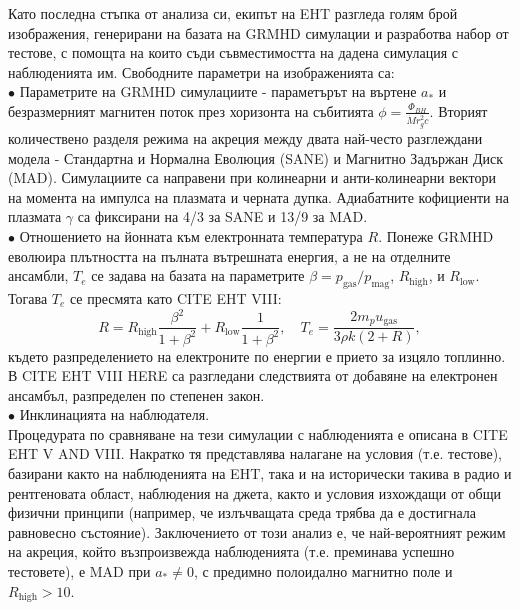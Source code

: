 Като последна стъпка от анализа си, екипът на EHT разгледа голям брой изображения, генерирани на базата на GRMHD симулации и разработва набор от тестове, с помощта на които съди съвместимостта на дадена симулация с наблюденията им. Свободните параметри на изображенията са:\\\newline
$\bullet$ Параметрите на GRMHD симулациите - параметърът на въртене $a_*$ и безразмерният магнитен поток през хоризонта на събитията $\phi = \frac{\Phi_{BH}}{\dot{M}r_g^2c}$. Вторият количествено разделя режима на акреция между двата най-често разглеждани модела - Стандартна и Нормална Еволюция (SANE) и Магнитно Задържан Диск (MAD). Симулациите са направени при колинеарни и анти-колинеарни вектори на момента на импулса на плазмата и черната дупка. Адиабатните кофициенти на плазмата $\gamma$ са фиксирани на 4/3 за SANE и 13/9 за MAD.\\\newline
$\bullet$ Отношението на йонната към електронната температура $R$. Понеже GRMHD еволюира плътността на пълната вътрешната енергия, а не на отделните ансамбли, $T_e$ се задава на базата на параметрите $\beta = p_{\text{gas}} / p_\text{mag}$, $R_\text{high}$, и $R_\text{low}$. Тогава $T_e$ се пресмята като CITE EHT VIII:
\begin{equation}
	R = R_\text{high}\frac{\beta^2}{1 + \beta^2} + R_\text{low}\frac{1}{1 + \beta^2},\quad T_e = \frac{2m_pu_\text{gas}}{3\rho k (2 + R)},
\end{equation}   
където разпределението на електроните по енергии е прието за изцяло топлинно. В CITE EHT VIII HERE са разгледани следствията от добавяне на електронен ансамбъл, разпределен по степенен закон.\\\newline
$\bullet$ Инклинацията на наблюдателя.\\

Процедурата по сравняване на тези симулации с наблюденията е описана в CITE EHT V AND VIII. Накратко тя представлява налагане на условия (т.е. тестове), базирани както на наблюденията на EHT, така и на исторически такива в радио и рентгеновата област, наблюдения на джета, както и условия изхождащи от общи физични принципи (например, че излъчващата среда трябва да е достигнала равновесно състояние). Заключението от този анализ е, че най-вероятният режим на акреция, който възпроизвежда наблюденията (т.е. преминава успешно тестовете), е MAD при $a_*\ne 0$, с предимно полоидално магнитно поле и $R_\text{high} > 10$. 


